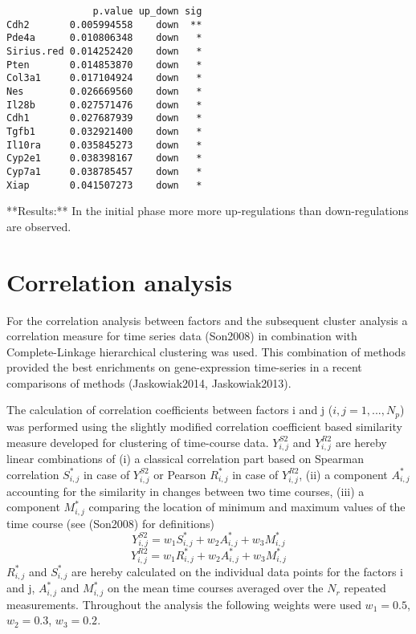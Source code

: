 \documentclass[]{article}
\begin{document}
\begin{verbatim}
               p.value up_down sig
Cdh2       0.005994558    down  **
Pde4a      0.010806348    down   *
Sirius.red 0.014252420    down   *
Pten       0.014853870    down   *
Col3a1     0.017104924    down   *
Nes        0.026669560    down   *
Il28b      0.027571476    down   *
Cdh1       0.027687939    down   *
Tgfb1      0.032921400    down   *
Il10ra     0.035845273    down   *
Cyp2e1     0.038398167    down   *
Cyp7a1     0.038785457    down   *
Xiap       0.041507273    down   *
\end{verbatim}

\normalsize
**Results:** In the initial phase more more up-regulations than
down-regulations are observed.

\section{Correlation analysis}\label{correlation-analysis}

For the correlation analysis between factors and the subsequent cluster
analysis a correlation measure for time series data (Son2008) in
combination with Complete-Linkage hierarchical clustering was used. This
combination of methods provided the best enrichments on gene-expression
time-series in a recent comparisons of methods (Jaskowiak2014,
Jaskowiak2013).

The calculation of correlation coefficients between factors i and j
(\(i,j=1, ...,N_p\)) was performed using the slightly modified
correlation coefficient based similarity measure developed for
clustering of time-course data. \(Y_{i,j}^{S2}\) and \(Y_{i,j}^{R2}\)
are hereby linear combinations of (i) a classical correlation part based
on Spearman correlation \(S_{i,j}^{*}\) in case of \(Y_{i,j}^{S2}\) or
Pearson \(R_{i,j}^{*}\) in case of \(Y_{i,j}^{R2}\), (ii) a component
\(A_{i,j}^{*}\) accounting for the similarity in changes between two
time courses, (iii) a component \(M_{i,j}^{*}\) comparing the location
of minimum and maximum values of the time course (see (Son2008) for
definitions)
\[Y_{i,j}^{S2} = w_1 S_{i,j}^{*} + w_2 A_{i,j}^{*} + w_3 M_{i,j}^{*}\]
\[Y_{i,j}^{R2} = w_1 R_{i,j}^{*} + w_2 A_{i,j}^{*} + w_3 M_{i,j}^{*}\]
\(R_{i,j}^{*}\) and \(S_{i,j}^{*}\) are hereby calculated on the
individual data points for the factors i and j, \(A_{i,j}^{*}\) and
\(M_{i,j}^{*}\) on the mean time courses averaged over the \(N_r\)
repeated measurements. Throughout the analysis the following weights
were used \(w_1=0.5\), \(w_2=0.3\), \(w_3=0.2\).
\end{document}
